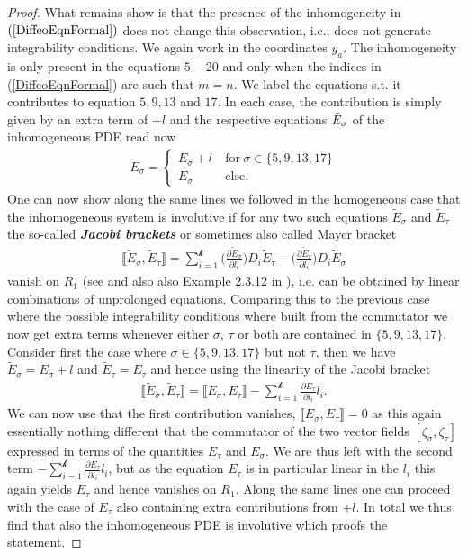 \documentclass[a4paper,12pt, DIV=14, BCOR=5mm, twoside, headsepline, numbers=noenddot]{scrbook}
\begin{document}
\begin{proof}
What remains show is that the presence of the inhomogeneity in $(\ref{DiffeoEqnFormal})$ does not change this observation, i.e., does not generate integrability conditions. We again work in the coordinates $y_a$. The inhomogeneity is only present in the equations $5-20$ and only when the indices in (\ref{DiffeoEqnFormal}) are such that $m = n$. We label the equations s.t. it contributes to equation $5,9,13$ and $17$. In each case, the contribution is simply given by an extra term of $+l$ and the respective equations $\Tilde{E}_{\sigma}$ of the inhomogeneous PDE read now 
\begin{align}
     \tilde{E}_{\sigma} = \begin{cases}
     E_{\sigma} + l \ &\text{for} \ \sigma \in \{ 5,9,13,17 \}\\
     E_{\sigma} \ &\text{else}.
     \end{cases}
\end{align}
One can now show along the same lines we followed in the homogeneous case that the inhomogeneous system is involutive if for any two such equations $\tilde{E}_{\sigma}$ and $\tilde{E}_{\tau}$ the so-called \textit{\textbf{Jacobi brackets}} or sometimes also called Mayer bracket 
\begin{align}
  \llbracket \tilde{E}_{\sigma}, \tilde{E}_{\tau} \rrbracket = \sum _{i = 1}^{\mathcal{k}} \biggl(\frac{\partial \tilde{E}_{\sigma}}{\partial l_i}\biggr) D_{i}\tilde{E}_{\tau} -  \biggl(\frac{\partial \tilde{E}_{\tau}}{\partial l_i}\biggr) D_{i}\tilde{E}_{\sigma} 
\end{align}
vanish on $R_1$ (see  \cite{seiler1994analysis} and also also Example 2.3.12 in \cite{seiler2009involution}), i.e. can be obtained by linear combinations of unprolonged equations. Comparing this to the previous case where the possible integrability conditions where built from the commutator we now get extra terms whenever either $\sigma$, $\tau$ or both are contained in $\{ 5,9,13,17 \}$. Consider first the case where $\sigma \in \{5,9,13,17\}$ but not $\tau$, then we have $\tilde{E}_{\sigma} = E_{\sigma} + l$ and $\tilde{E}_{\tau} = E_{\tau}$ and hence using the linearity of the Jacobi bracket
\begin{align}
    \llbracket \tilde{E}_{\sigma}, \tilde{E}_{\tau} \rrbracket = \llbracket E_{\sigma}, E_{\tau} \rrbracket - \sum_{i=1}^{\mathcal{k}} \frac{\partial E_{\tau}}{\partial l_i} l_i.
\end{align}
We can now use that the first contribution vanishes, $\llbracket E_{\sigma}, E_{\tau} \rrbracket = 0$ as this again essentially nothing different that the commutator of the two vector fields $[\zeta_{\sigma},\zeta_{\tau}]$ expressed in terms of the quantities $E_{\tau}$ and $E_{\sigma}$. We are thus left with the second term $- \sum_{i=1}^{\mathcal{k}} \frac{\partial E_{\tau}}{\partial l_i} l_i$, but as the equation $E_{\tau}$ is in particular linear in the $l_i$ this again yields $E_{\tau}$ and hence vanishes on $R_1$. Along the same lines one can proceed with the case of $E_{\tau}$ also containing extra contributions from $+l$. In total we thus find that also the inhomogeneous PDE is involutive which proofs the statement.
\end{proof}
\end{document}
